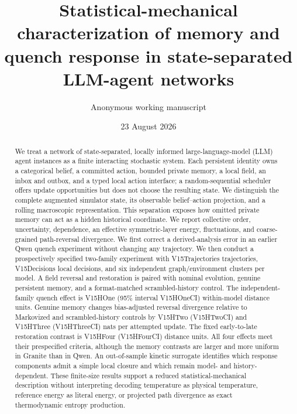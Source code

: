 \documentclass[12pt]{article}
\title{Statistical-mechanical characterization of memory and quench response in state-separated LLM-agent networks}
\author{Anonymous working manuscript}
\date{23 August 2026}
\begin{document}
\maketitle

\begin{abstract}
We treat a network of state-separated, locally informed large-language-model
(LLM) agent instances as a finite interacting stochastic system.  Each
persistent identity owns a categorical belief, a committed action, bounded
private memory, a local field, an inbox and outbox, and a typed local action
interface;
a random-sequential scheduler offers update opportunities but does not choose
the resulting state.  We distinguish the complete augmented simulator state,
its observable belief--action projection, and a rolling macroscopic
representation.  This separation exposes how omitted private memory can act
as a hidden historical coordinate.  We report collective order, uncertainty,
dependence, an effective symmetric-layer energy, fluctuations, and
coarse-grained path-reversal divergence.  We first correct a derived-analysis
error in an earlier Qwen quench experiment without changing any trajectory.
We then conduct a prospectively specified two-family experiment with
\csname V15Trajectories\endcsname{} trajectories,
\csname V15Decisions\endcsname{} local decisions, and six
independent graph/environment clusters per model.  A field reversal and
restoration is paired with nominal evolution, genuine persistent memory, and a
format-matched scrambled-history control.  The independent-family quench
effect is \csname V15HOne\endcsname{} (95\% interval
\csname V15HOneCI\endcsname) within-model distance units.  Genuine
memory changes bias-adjusted reversal divergence relative to Markovized and
scrambled-history controls by \csname V15HTwo\endcsname{}
(\csname V15HTwoCI\endcsname) and \csname V15HThree\endcsname{}
(\csname V15HThreeCI\endcsname) nats per attempted update.  The fixed
early-to-late restoration contrast is \csname V15HFour\endcsname{}
(\csname V15HFourCI\endcsname) distance units.  All four effects meet their
prespecified criteria, although the memory contrasts are larger and more uniform in
Granite than in Qwen.  An out-of-sample kinetic
surrogate identifies which response components admit a simple local closure
and which remain model- and history-dependent.  These finite-size results
support a reduced statistical-mechanical description without interpreting
decoding temperature as physical temperature, reference energy as literal
energy, or projected path divergence as exact thermodynamic entropy
production.
\end{abstract}
\end{document}
